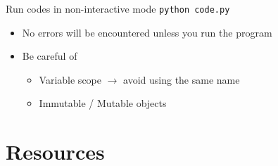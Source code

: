 \documentclass{../TexTemplate/myslide}
\begin{document}

\begin{frame}[fragile]{Run codes in non-interactive mode}
\verb'python code.py'
\begin{itemize}
\item No errors will be encountered unless you run the program
\item Be careful of
\begin{itemize}
	\item Variable scope $\to$ avoid using the same name
	\item Immutable / Mutable objects
\end{itemize}
\end{itemize}
\end{frame}

\section{Resources}
\begin{frame}
\sectionpage
\end{frame}
\end{document}

